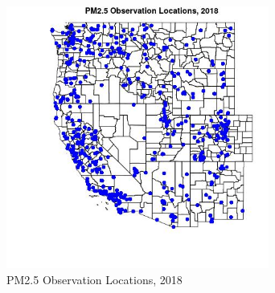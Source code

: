 \begin{figure} 
\centering  
\includegraphics[width=0.77\textwidth]{Code_Outputs/Report_PM25_Step4_part_e_de_duplicated_aves_prioritize_24hr_obs_ML_input_PlotLoc2018.jpg} 
\caption{\label{fig:Report_PM25_Step4_part_e_de_duplicated_aves_prioritize_24hr_obs_ML_inputPlotLoc2018}PM2.5 Observation Locations, 2018} 
\end{figure} 
 
